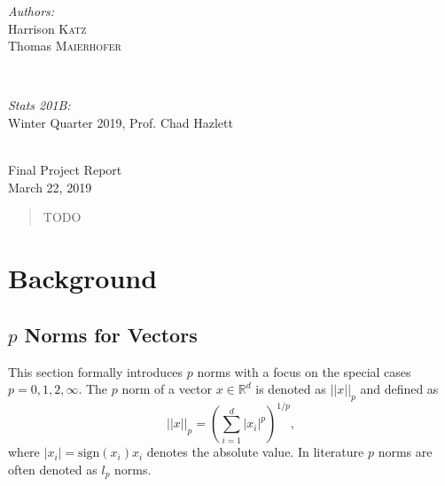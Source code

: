 \documentclass[12pt, twoside]{article}
\newcommand{\R}{\mathbb{R}}
\newcommand{\1}{\mathbb{1}}
\begin{document}
\begin{titlepage}
    	\hspace{1cm}
    \begin{minipage}{0.4\textwidth}
    \begin{flushleft} \large
    \emph{Authors:}\\
        Harrison \textsc{Katz} \\
        Thomas \textsc{Maierhofer} %
    \end{flushleft}
    \end{minipage}
    ~
    \begin{minipage}{0.4\textwidth}
    \begin{flushright} \large
    \emph{Stats 201B:} \\
    Winter Quarter 2019,
    Prof. Chad Hazlett %
    \end{flushright}
    \end{minipage}\\[2cm]
    
    \large{
    Final Project Report
    } \\[2cm]
    
    {\large March 22, 2019}\\[2cm] %


    \vfill %

\end{titlepage}


\tableofcontents 
\clearpage

\begin{abstract}
TODO
\end{abstract}
\clearpage
{}

\section{Background}
\subsection{$p$ Norms for Vectors}
This section formally introduces $p$ norms with a focus on the special cases $ p = 0, 1, 2, \infty$.
The $p$ norm of a vector $x \in \R^d$ is denoted as $||x||_p$ and defined as
$$||x||_p = \left(\sum_{i = 1}^d |x_i|^p \right)^{1/p},$$
where $|x_i| = \text{sign}(x_i)x_i$ denotes the absolute value. In literature $p$ norms are often denoted as $l_p$ norms.
\end{document}

